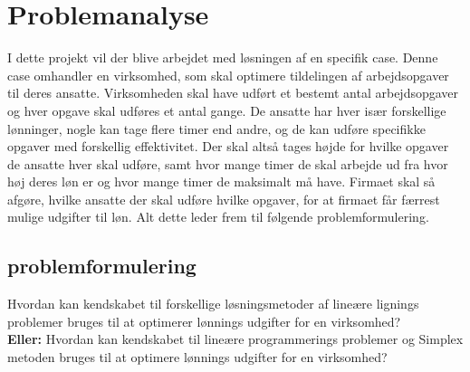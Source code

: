 \section{Problemanalyse}
I dette projekt vil der blive arbejdet med løsningen af en specifik case. 
Denne case omhandler en virksomhed, som skal optimere tildelingen af arbejdsopgaver til deres ansatte.
Virksomheden skal have udført et bestemt antal arbejdsopgaver og hver opgave skal udføres et antal gange. 
De ansatte har hver især forskellige lønninger, nogle kan tage flere timer end andre, og de kan udføre specifikke opgaver med forskellig effektivitet.
Der skal altså tages højde for hvilke opgaver de ansatte hver skal udføre, samt hvor mange timer de skal arbejde ud fra hvor høj deres løn er og hvor mange timer de maksimalt må have.
Firmaet skal så afgøre, hvilke ansatte der skal udføre hvilke opgaver, for at firmaet får færrest mulige udgifter til løn. 
Alt dette leder frem til følgende problemformulering.

\subsection{problemformulering}
Hvordan kan kendskabet til forskellige løsningsmetoder af lineære lignings problemer bruges til at optimerer lønnings udgifter for en virksomhed?
\\ \textbf{Eller:} Hvordan kan kendskabet til lineære programmerings problemer og Simplex metoden bruges til at optimere lønnings udgifter for en virksomhed?
